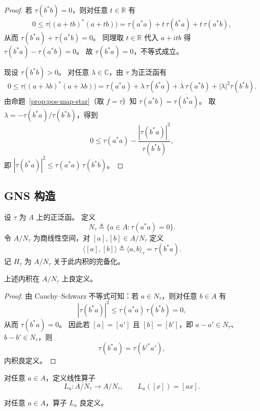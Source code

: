 \documentclass[lang=cn,a4paper,newtx,section]{elegantbook}
\begin{document}
\begin{proof}
  若 $\tau(b^{*}b)=0$，则对任意 $t\in\mathbb{R}$ 有
  \[
    0\le \tau\bigl((a+tb)^{*}(a+tb)\bigr)=\tau(a^{*}a)+t\,\tau(b^{*}a)+t\,\tau(a^{*}b),
  \]
  从而 $\tau(b^{*}a)+\tau(a^{*}b)=0$。
  同理取 $t\in\mathbb{R}$ 代入 $a+itb$ 得 $\tau(b^{*}a)-\tau(a^{*}b)=0$。
  故 $\tau(b^{*}a)=0$，不等式成立。

  现设 $\tau(b^{*}b)>0$。
  对任意 $\lambda\in\mathbb{C}$，由 $\tau$ 为正泛函有
  \[
    0\le \tau\bigl((a+\lambda b)^{*}(a+\lambda b)\bigr)
    =\tau(a^{*}a)+\lambda\,\tau(b^{*}a)+\overline{\lambda}\,\tau(a^{*}b)+|\lambda|^{2}\tau(b^{*}b).
  \]
  由命题~\ref{prop:pos-map-star}（取 $f=\tau$）知 $\tau(a^{*}b)=\overline{\tau(b^{*}a)}$。
  取 $\lambda=-\tau(b^{*}a)/\tau(b^{*}b)$，得到
  \[
    0\le \tau(a^{*}a)-\frac{|\tau(b^{*}a)|^{2}}{\tau(b^{*}b)},
  \]
  即 $|\tau(b^{*}a)|^{2}\le \tau(a^{*}a)\,\tau(b^{*}b)$。
\end{proof}

\subsection{GNS 构造}

\begin{definition}
  设 $\tau$ 为 $A$ 上的正泛函。
  定义
  \[
    N_{\tau}\triangleq\{a\in A:\tau(a^{*}a)=0\}.
  \]
  令 $A/N_{\tau}$ 为商线性空间，对 $[a],[b]\in A/N_{\tau}$ 定义
  \[
    \langle[a],[b]\rangle\triangleq\langle a,b\rangle_{\tau}=\tau(b^{*}a).
  \]
  记 $H_{\tau}$ 为 $A/N_{\tau}$ 关于此内积的完备化。
\end{definition}

\begin{proposition}
  上述内积在 $A/N_{\tau}$ 上良定义。
\end{proposition}

\begin{proof}
  由 Cauchy--Schwarz 不等式可知：若 $a\in N_{\tau}$，则对任意 $b\in A$ 有
  \[
    |\tau(b^{*}a)|^{2}\le \tau(a^{*}a)\,\tau(b^{*}b)=0,
  \]
  从而 $\tau(b^{*}a)=0$。
  因此若 $[a]=[a']$ 且 $[b]=[b']$，即 $a-a'\in N_{\tau}$、$b-b'\in N_{\tau}$，则
  \[
    \tau(b^{*}a)=\tau(b'^{*}a'),
  \]
  内积良定义。
\end{proof}

\begin{definition}
  对任意 $a\in A$，定义线性算子
  \[
    L_{a}:A/N_{\tau}\to A/N_{\tau},\qquad L_{a}([x])=[ax].
  \]
\end{definition}

\begin{proposition}
  对任意 $a\in A$，算子 $L_{a}$ 良定义。
\end{proposition}
\end{document}
